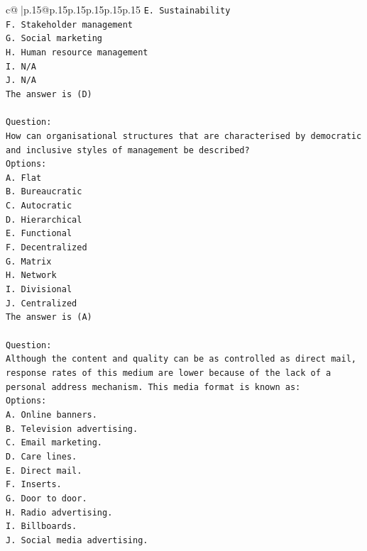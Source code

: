 \documentclass{article}
\begin{document}
{\begin{supertabular}{c@{$\;$}|p{.15\linewidth}@{}p{.15\linewidth}p{.15\linewidth}p{.15\linewidth}p{.15\linewidth}p{.15\linewidth}}
{{{\texttt{E. Sustainability} \\
\texttt{F. Stakeholder management} \\
\texttt{G. Social marketing} \\
\texttt{H. Human resource management} \\
\texttt{I. N/A} \\
\texttt{J. N/A} \\
\texttt{The answer is (D)} \\
\\ 
\texttt{Question:} \\
\texttt{How can organisational structures that are characterised by democratic and inclusive styles of management be described?} \\
\texttt{Options:} \\
\texttt{A. Flat} \\
\texttt{B. Bureaucratic} \\
\texttt{C. Autocratic} \\
\texttt{D. Hierarchical} \\
\texttt{E. Functional} \\
\texttt{F. Decentralized} \\
\texttt{G. Matrix} \\
\texttt{H. Network} \\
\texttt{I. Divisional} \\
\texttt{J. Centralized} \\
\texttt{The answer is (A)} \\
\\ 
\texttt{Question:} \\
\texttt{Although the content and quality can be as controlled as direct mail, response rates of this medium are lower because of the lack of a personal address mechanism. This media format is known as:} \\
\texttt{Options:} \\
\texttt{A. Online banners.} \\
\texttt{B. Television advertising.} \\
\texttt{C. Email marketing.} \\
\texttt{D. Care lines.} \\
\texttt{E. Direct mail.} \\
\texttt{F. Inserts.} \\
\texttt{G. Door to door.} \\
\texttt{H. Radio advertising.} \\
\texttt{I. Billboards.} \\
\texttt{J. Social media advertising.} \\
}}}
\end{supertabular}}
\end{document}
